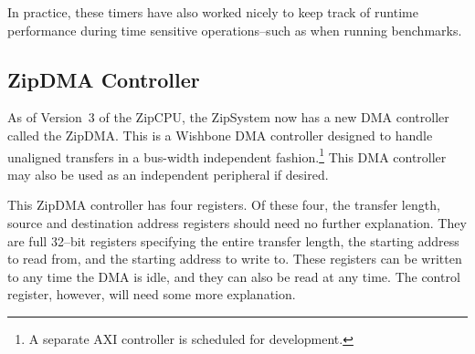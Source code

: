 \documentclass{gqtekspec}
\begin{document}
In practice, these timers have also worked nicely to keep track of runtime
performance during time sensitive operations--such as when running benchmarks.

\subsection{ZipDMA Controller}\label{sec:reg-dmac}

As of  Version~3 of the ZipCPU, the ZipSystem now has a new DMA controller
called the ZipDMA.  This is a Wishbone DMA controller designed to handle
unaligned transfers in a bus-width independent fashion.\footnote{A separate
AXI controller is scheduled for development.}  This DMA controller
may also be used as an independent peripheral if desired.

This ZipDMA controller has four registers.  Of these four, the transfer length,
source and destination address registers should need no further explanation.
They are full 32--bit registers specifying the entire transfer length, the
starting address to read from, and the starting address to write to.  These
registers can be written to any time the DMA is idle, and they can also be read
at any time.  The control register, however, will need some more explanation.
\end{document}
